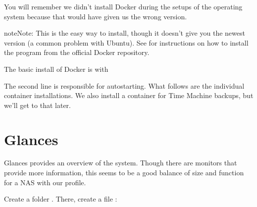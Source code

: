 \documentclass[a4paper,10pt,english]{sphinxmanual}
\begin{document}
You will remember we didn’t install Docker during the setups of the operating
system because that would have given us the wrong version.

\begin{sphinxadmonition}{note}{Note:}
This is the easy way to install, though it doesn’t give you the newest
version (a common problem with Ubuntu). See
for instructions on how to install the program from the official Docker
repository.
\end{sphinxadmonition}

The basic install of Docker is with

\begin{sphinxVerbatim}[commandchars=\\\{\}]
   
   
\end{sphinxVerbatim}

The second line is responsible for autostarting. What follows are the
individual container installations. We also install a container for Time Machine
backups, but we’ll get to that later.


\section{Glances}
\label{\detokenize{containers:glances}}
Glances provides an overview of the system. Though there are monitors that
provide more information, this seems to be a good balance of size and function
for a NAS with our profile.

\begin{sphinxVerbatim}[commandchars=\\\{\}]
   
\end{sphinxVerbatim}

Create a folder . There, create a file :
\end{document}
